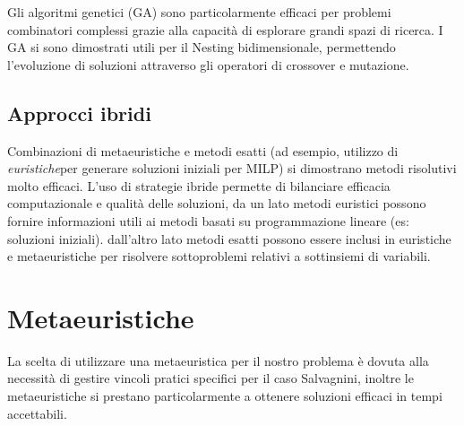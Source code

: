 Gli algoritmi genetici (GA) sono particolarmente efficaci per problemi combinatori complessi grazie alla capacità di esplorare grandi spazi di ricerca. I GA si sono dimostrati utili per il Nesting bidimensionale, permettendo l'evoluzione di soluzioni attraverso gli operatori di crossover e mutazione.


\subsection{Approcci ibridi}

Combinazioni di metaeuristiche e metodi esatti (ad esempio, utilizzo di \emph{euristiche}\glsfirstoccur per generare soluzioni iniziali per MILP) si dimostrano metodi risolutivi molto efficaci. L'uso di strategie ibride permette di bilanciare efficacia computazionale e qualità delle soluzioni, da un lato metodi euristici possono fornire informazioni utili ai metodi basati su programmazione lineare (es: soluzioni iniziali). dall'altro lato metodi esatti possono essere inclusi in euristiche e metaeuristiche per risolvere sottoproblemi relativi a sottinsiemi di variabili. 

\section{Metaeuristiche}

La scelta di utilizzare una metaeuristica per il nostro problema è dovuta alla necessità di gestire vincoli pratici specifici per il caso Salvagnini, inoltre le metaeuristiche si prestano particolarmente a ottenere soluzioni efficaci in tempi accettabili.

